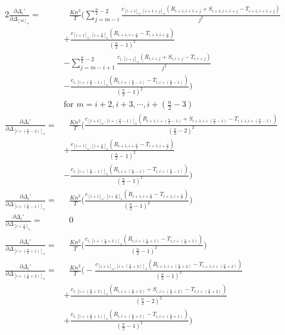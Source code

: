 \begin{alignat}{2}
\frac{\partial \Delta_i'}{\partial \Delta_{[m]_n}} =& \text{ }\frac{Kn^2}{T} \Bigg(\sum_{j= m-i}^{\frac{n}{2}-2}  \frac{c_{[i+1]_n,[i+1+j]_n}(R_{i+1,i+1+j} + S_{i+1,i+1+j} - T_{i+1,i+1+j})}{j^2} \nonumber \\
  &+ \frac{c_{[i+1]_n,[i+\frac{n}{2}]_n}(R_{i+1,i+\frac{n}{2}} - T_{i+1,i+\frac{n}{2}})}{(\frac{n}{2}-1)^2} \nonumber \\
  &- \sum_{j= m-i+1}^{\frac{n}{2}-2}  \frac{c_{i,[i+j]_n}(R_{i,i+j} + S_{i,i+j} - T_{i,i+j})}{j^2} \nonumber \\
  &- \frac{c_{i,[i+(\frac{n}{2}-1)]_n}(R_{i,i+(\frac{n}{2}-1)} - T_{i,i+(\frac{n}{2}-1)})}{(\frac{n}{2}-1)^2} \Bigg) \nonumber \\
  &\text{for } m = i+2, i+3, \cdots, i + (\frac{n}{2} - 3) \nonumber \\
\frac{\partial \Delta_i'}{\partial \Delta_{[i+(\frac{n}{2}-2)]_n}} =& \text{ }\frac{Kn^2}{T} \Bigg( \frac{c_{[i+1]_n,[i+(\frac{n}{2}-1)]_n}(R_{i+1,i+(\frac{n}{2}-1)} + S_{i+1,i+(\frac{n}{2}-1)} - T_{i+1,i+(\frac{n}{2}-1)})}{(\frac{n}{2}-2)^2} \nonumber \\
 &+ \frac{c_{[i+1]_n,[i+\frac{n}{2}]_n}(R_{i+1,i+\frac{n}{2}} - T_{i+1,i+\frac{n}{2}})}{(\frac{n}{2}-1)^2} \nonumber \\
 &- \frac{c_{i,[i+(\frac{n}{2}-1)]_n}(R_{i,i+(\frac{n}{2}-1)} - T_{i,i+(\frac{n}{2}-1)})}{(\frac{n}{2}-1)^2} \Bigg) \nonumber \\
\frac{\partial \Delta_i'}{\partial \Delta_{[i+(\frac{n}{2}-1)]_n}} =& \text{ } \frac{Kn^2}{T} \Bigg( \frac{c_{[i+1]_n,[i+\frac{n}{2}]_n}(R_{i+1,i+\frac{n}{2}} - T_{i+1,i+\frac{n}{2}})}{(\frac{n}{2}-1)^2} \Bigg) \nonumber \ \\
\frac{\partial \Delta_i'}{\partial \Delta_{[i+\frac{n}{2}]_n}} =& \text{ }0 \nonumber \\
\frac{\partial \Delta_i'}{\partial \Delta_{[i+(\frac{n}{2}+1)]_n}} =& \text{ } \frac{Kn^2}{T} \Bigg( \frac{c_{i,[i+(\frac{n}{2}+1)]_n}(R_{i,i+(\frac{n}{2}+1)} - T_{i,i+(\frac{n}{2}+1)})}{(\frac{n}{2}-1)^2} \Bigg) \nonumber \\
\frac{\partial \Delta_i'}{\partial \Delta_{[i+(\frac{n}{2}+2)]_n}} =& \text{ }\frac{Kn^2}{T} \Bigg( - \frac{c_{[i+1]_n,[i+(\frac{n}{2}+2)]_n}(R_{i+1,i+(\frac{n}{2}+2)} - T_{i+1,i+(\frac{n}{2}+2)})}{(\frac{n}{2}-1)^2} \nonumber \\
  &+ \frac{c_{i,[i+(\frac{n}{2}+2)]_n}(R_{i,i+(\frac{n}{2}+2)} + S_{i,i+(\frac{n}{2}+2)} - T_{i,i+(\frac{n}{2}+2)})}{(\frac{n}{2}-2)^2} \nonumber \\
  &+ \frac{c_{i,[i+(\frac{n}{2}+1)]_n}(R_{i,i+(\frac{n}{2}+1)} - T_{i,i+(\frac{n}{2}+1)})}{(\frac{n}{2}-1)^2} \Bigg) \nonumber \\

\end{alignat}
